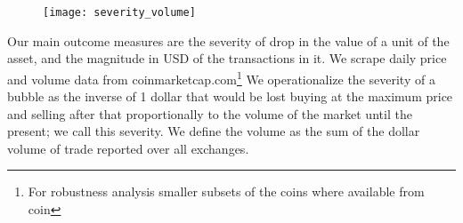 \begin{figure}[h]
\texttt{[image: severity\_volume]}
\end{figure}

Our main outcome measures are the severity of drop in the value of a unit of the asset, and the magnitude in USD of the transactions in it.
We scrape daily price and volume data from coinmarketcap.com\footnote{ For robustness analysis smaller subsets of the coins where available from coin }
We operationalize the severity of a bubble as the inverse of 1 dollar that would be lost buying at the maximum price and selling after that proportionally to the volume of the market until the present; we call this severity.
We define the volume as the sum of the dollar volume of trade reported over all exchanges.
